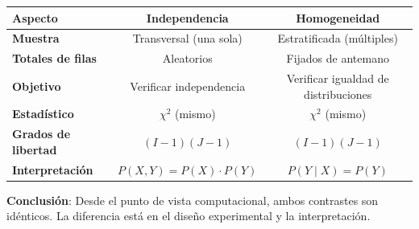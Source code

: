 \documentclass[10pt,a4paper]{article}
\begin{document}
\begin{tcolorbox}[title=Comparación: Independencia vs Homogeneidad]
    \begin{center}
    \begin{tabular}{|l|c|c|}
    \hline
    \textbf{Aspecto} & \textbf{Independencia} & \textbf{Homogeneidad} \\
    \hline
    \textbf{Muestra} & Transversal (una sola) & Estratificada (múltiples) \\
    \hline
    \textbf{Totales de filas} & Aleatorios & Fijados de antemano \\
    \hline
    \textbf{Objetivo} & Verificar independencia & Verificar igualdad de distribuciones \\
    \hline
    \textbf{Estadístico} & $\chi^2$ (mismo) & $\chi^2$ (mismo) \\
    \hline
    \textbf{Grados de libertad} & $(I-1)(J-1)$ & $(I-1)(J-1)$ \\
    \hline
    \textbf{Interpretación} & $P(X, Y) = P(X) \cdot P(Y)$ & $P(Y \mid X) = P(Y)$ \\
    \hline
    \end{tabular}
    \end{center}
    
    \textbf{Conclusión}: Desde el punto de vista computacional, ambos contrastes son idénticos. La diferencia está en el diseño experimental y la interpretación.
\end{tcolorbox}

\end{document}
